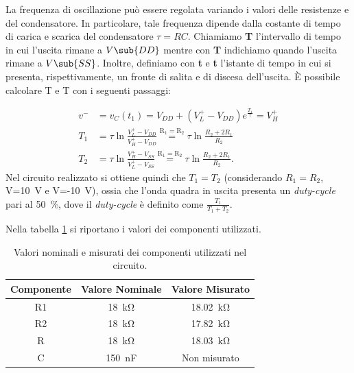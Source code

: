 \noindent
La frequenza di oscillazione può essere regolata variando i valori delle resistenze e del condensatore. In particolare, tale frequenza dipende dalla costante di tempo di carica e scarica del condensatore $\tau=RC$. Chiamiamo \textbf{T} l'intervallo di tempo in cui l'uscita rimane a $V\sub{DD}$ mentre con \textbf{T} indichiamo quando l'uscita rimane a $V\sub{SS}$. Inoltre, definiamo con \textbf{t} e \textbf{t} l'istante di tempo in cui si presenta, rispettivamente, un fronte di salita e di discesa dell'uscita. \`E possibile calcolare T e T con i seguenti passaggi:

\begin{equation}
	\begin{split}
		v^-&=v_C(t_1)=V_{DD}+(V_L^+-V_{DD})e^{\frac{T_1}{\tau}}=V_H^+ \\
		T_1&=\tau \ln{\frac{V_L^+-V_{DD}}{V_H^+-V_{DD}}}\overset{\mathrm{R_1=R_2}}{=}\tau \ln{\frac{R_2+2R_1}{R_2}} \\
		T_2&=\tau \ln{\frac{V_H^+-V_{SS}}{V_L^+-V_{SS}}}\overset{\mathrm{R_1=R_2}}{=}\tau \ln{\frac{R_2+2R_1}{R_2}}.
	\end{split}
	\label{eq:t1_t2_3}
\end{equation}
Nel circuito realizzato si ottiene quindi che $T_1=T_2$ (considerando $R_1=R_2$, V=\SI{10}{\volt} e V=-\SI{10}{\volt}), ossia che l'onda quadra in uscita presenta un \textit{duty-cycle} pari al \SI{50}{\percent}, dove il \textit{duty-cycle} è definito come $\frac{T_1}{T_1+T_2}$.

\noindent
Nella tabella \ref{tab:valori_componenti_3} si riportano i valori dei componenti utilizzati.
\def\arraystretch{1.3}
\begin{table}[h]
	\centering
	\begin{tabular}{|c|c|c|}
		\hline
		Componente	& Valore Nominale & Valore Misurato \\ \hline
		R1 &\SI{18}{\kilo\ohm} & \SI{18,02}{\kilo\ohm} \\ \hline
		R2 &\SI{18}{\kilo\ohm} & \SI{17,82}{\kilo\ohm} \\ \hline
		R & \SI{18}{\kilo\ohm} & \SI{18,03}{\kilo\ohm} \\ \hline
		C & \SI{150}{\nano\farad} & Non misurato \\ \hline
	\end{tabular}
	\caption{Valori nominali e misurati dei componenti utilizzati nel circuito.}
	\label{tab:valori_componenti_3}
\end{table}

